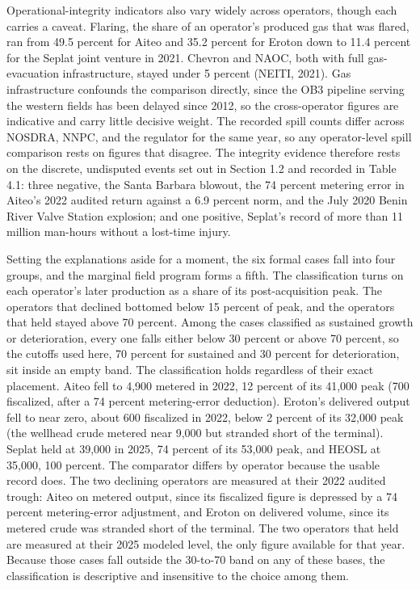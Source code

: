 Operational-integrity indicators also vary widely across operators,
though each carries a caveat. Flaring, the share of an operator's
produced gas that was flared, ran from 49.5 percent for Aiteo and 35.2
percent for Eroton down to 11.4 percent for the Seplat joint venture in
2021. Chevron and NAOC, both with full gas-evacuation infrastructure,
stayed under 5 percent (NEITI, 2021). Gas infrastructure confounds the
comparison directly, since the OB3 pipeline serving the western fields
has been delayed since 2012, so the cross-operator figures are
indicative and carry little decisive weight. The recorded spill counts
differ across NOSDRA, NNPC, and the regulator for the same year, so any
operator-level spill comparison rests on figures that disagree. The
integrity evidence therefore rests on the discrete, undisputed events
set out in Section 1.2 and recorded in Table 4.1: three negative, the
Santa Barbara blowout, the 74 percent metering error in Aiteo's 2022
audited return against a 6.9 percent norm, and the July 2020 Benin River
Valve Station explosion; and one positive, Seplat's record of more than
11 million man-hours without a lost-time injury.

Setting the explanations aside for a moment, the six formal cases fall
into four groups, and the marginal field program forms a fifth. The
classification turns on each operator's later production as a share of
its post-acquisition peak. The operators that declined bottomed below 15
percent of peak, and the operators that held stayed above 70 percent.
Among the cases classified as sustained growth or deterioration, every
one falls either below 30 percent or above 70 percent, so the cutoffs
used here, 70 percent for sustained and 30 percent for deterioration,
sit inside an empty band. The classification holds regardless of their
exact placement. Aiteo fell to 4,900 metered in 2022, 12 percent of its
41,000 peak (700 fiscalized, after a 74 percent metering-error
deduction). Eroton's delivered output fell to near zero, about 600
fiscalized in 2022, below 2 percent of its 32,000 peak (the wellhead
crude metered near 9,000 but stranded short of the terminal). Seplat
held at 39,000 in 2025, 74 percent of its 53,000 peak, and HEOSL at
35,000, 100 percent. The comparator differs by operator because the
usable record does. The two declining operators are measured at their
2022 audited trough: Aiteo on metered output, since its fiscalized
figure is depressed by a 74 percent metering-error adjustment, and
Eroton on delivered volume, since its metered crude was stranded short
of the terminal. The two operators that held are measured at their 2025
modeled level, the only figure available for that year. Because those
cases fall outside the 30-to-70 band on any of these bases, the
classification is descriptive and insensitive to the choice among them.

